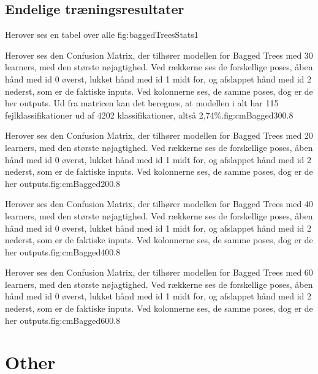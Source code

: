 \section{Endelige træningsresultater}

{Herover ses en tabel over alle }{fig:baggedTreesStats}{1}

{Herover ses den Confusion Matrix, der tilhører modellen for Bagged Trees med 30 learners, med den største nøjagtighed. Ved rækkerne ses de forskellige poses, åben hånd med id 0 øverst, lukket hånd med id 1 midt for, og afslappet hånd med id 2 nederst, som er de faktiske inputs. Ved kolonnerne ses, de samme poses, dog er de her outputs. Ud fra matricen kan det beregnes, at modellen i alt har 115 fejlklassifikationer ud af 4202 klassifikationer, altså 2,74\%.}{fig:cmBagged30}{0.8}

{Herover ses den Confusion Matrix, der tilhører modellen for Bagged Trees med 20 learners, med den største nøjagtighed. Ved rækkerne ses de forskellige poses, åben hånd med id 0 øverst, lukket hånd med id 1 midt for, og afslappet hånd med id 2 nederst, som er de faktiske inputs. Ved kolonnerne ses, de samme poses, dog er de her outputs.}{fig:cmBagged20}{0.8}

{Herover ses den Confusion Matrix, der tilhører modellen for Bagged Trees med 40 learners, med den største nøjagtighed. Ved rækkerne ses de forskellige poses, åben hånd med id 0 øverst, lukket hånd med id 1 midt for, og afslappet hånd med id 2 nederst, som er de faktiske inputs. Ved kolonnerne ses, de samme poses, dog er de her outputs.}{fig:cmBagged40}{0.8}

{Herover ses den Confusion Matrix, der tilhører modellen for Bagged Trees med 60 learners, med den største nøjagtighed. Ved rækkerne ses de forskellige poses, åben hånd med id 0 øverst, lukket hånd med id 1 midt for, og afslappet hånd med id 2 nederst, som er de faktiske inputs. Ved kolonnerne ses, de samme poses, dog er de her outputs.}{fig:cmBagged60}{0.8}

\chapter{Other}
\newpage
\listoftables
\vspace{1cm}
\listoffigures